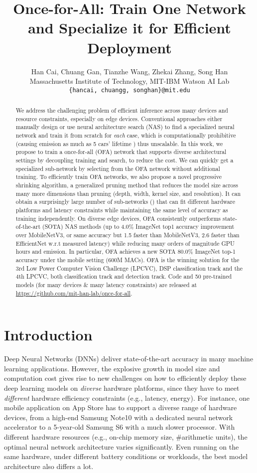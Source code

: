 \documentclass{article} \usepackage{iclr2020_conference,times}
\title{Once-for-All: Train One Network and Specialize it for Efficient Deployment}
\author{
    Han Cai, Chuang Gan, Tianzhe Wang, Zhekai Zhang, Song Han\\
    Massachusetts Institute of Technology, \quad MIT-IBM Watson AI Lab\\
    {\small\texttt{\{hancai, chuangg, songhan\}@mit.edu}}
}
\begin{document}
\maketitle
\begin{abstract}
We address the challenging problem of efficient inference across many devices and resource constraints, especially on edge devices.  Conventional approaches either manually design or use neural architecture search (NAS) to find a specialized neural network and train it from scratch for \textit{each} case, which is computationally prohibitive (causing  emission as much as 5 cars' lifetime \cite{strubell2019energy}) thus unscalable. 
In this work, we propose to train a once-for-all (OFA) network that supports diverse architectural settings by decoupling training and search, to reduce the cost. 
We can quickly get a specialized sub-network by selecting from the OFA network without additional training. To efficiently train OFA networks, we also propose a novel progressive shrinking algorithm, a generalized pruning method that reduces the model size across many more dimensions than pruning (depth, width, kernel size, and resolution). It can obtain a surprisingly large number of sub-networks () that can fit different hardware platforms and latency constraints while maintaining the same level of accuracy as training independently. 
On diverse edge devices, OFA consistently outperforms state-of-the-art (SOTA) NAS methods (up to 4.0\% ImageNet top1 accuracy improvement over MobileNetV3, or same accuracy but 1.5 faster than MobileNetV3, 2.6 faster than EfficientNet w.r.t measured latency) while reducing many orders of magnitude GPU hours and  emission. In particular, OFA achieves a new SOTA 80.0\% ImageNet top-1 accuracy under the mobile setting (600M MACs). OFA is the winning solution for the 3rd Low Power Computer Vision Challenge (LPCVC), DSP classification track and the 4th LPCVC, both classification track and detection track. Code and  50 pre-trained models (for many devices \& many latency constraints) are released at \url{https://github.com/mit-han-lab/once-for-all}. 
\end{abstract}

\section{Introduction}

Deep Neural Networks (DNNs) deliver state-of-the-art accuracy in many machine learning applications.
However, the explosive growth in model size and computation cost gives rise to new challenges on how to efficiently deploy these deep learning models on \emph{diverse} hardware platforms, since they have to meet \emph{different} hardware efficiency constraints (e.g., latency, energy). 
For instance, one mobile application on App Store has to support a diverse range of hardware devices, from a high-end Samsung Note10 with a dedicated neural network accelerator to a 5-year-old Samsung S6 with a much slower processor. With different hardware resources (e.g., on-chip memory size, \#arithmetic units), the optimal neural network architecture varies significantly. Even running on the same hardware, under different battery conditions or workloads, the best model architecture also differs a lot. 
\end{document}
